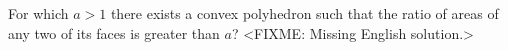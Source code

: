 \problem
For which $a > 1$ there exists a convex polyhedron such that the ratio of
areas of any two of its faces is greater than $a$?
\solution
<FIXME: Missing English solution.>
\endproblem
